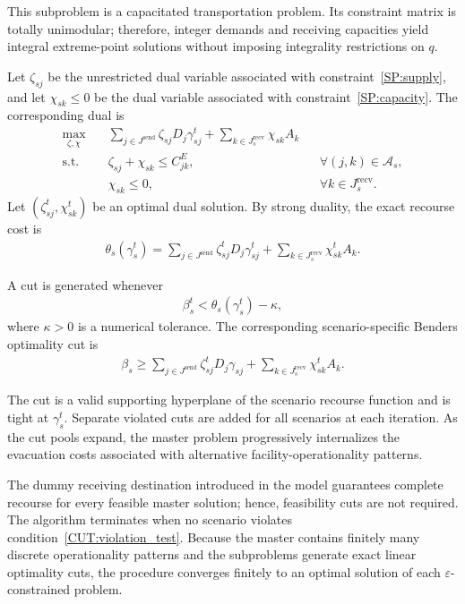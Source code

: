 \documentclass[preprint,11pt,authoryear]{elsarticle}
\begin{document}
This subproblem is a capacitated transportation problem. Its constraint
matrix is totally unimodular; therefore, integer demands and receiving
capacities yield integral extreme-point solutions without imposing
integrality restrictions on $q$.

Let $\zeta_{sj}$ be the unrestricted dual variable associated with
constraint~\eqref{SP:supply}, and let $\chi_{sk}\leq0$ be the dual variable
associated with constraint~\eqref{SP:capacity}. The corresponding dual is
\begin{align}
\max_{\zeta,\chi}\quad
& \sum_{j\in J^{\mathrm{send}}}\zeta_{sj}D_j\gamma_{sj}^t
+\sum_{k\in J_s^{\mathrm{recv}}}\chi_{sk}A_k
\label{DSP:obj}
\\
\text{s.t.}\quad
& \zeta_{sj}+\chi_{sk}\leq C_{jk}^E,
&& \forall (j,k)\in\mathcal A_s,
\label{DSP:arc}
\\
& \chi_{sk}\leq0,
&& \forall k\in J_s^{\mathrm{recv}}.
\label{DSP:sign}
\end{align}
Let
$(\zeta_{sj}^t,\chi_{sk}^t)$ be an optimal dual solution. By strong duality,
the exact recourse cost is
\begin{align}
\theta_s(\gamma_s^t)
=
\sum_{j\in J^{\mathrm{send}}}
\zeta_{sj}^tD_j\gamma_{sj}^t
+
\sum_{k\in J_s^{\mathrm{recv}}}
\chi_{sk}^tA_k.
\label{CUT:recourse_value}
\end{align}

A cut is generated whenever
\begin{align}
\beta_s^t
<
\theta_s(\gamma_s^t)-\kappa,
\label{CUT:violation_test}
\end{align}
where $\kappa>0$ is a numerical tolerance. The corresponding scenario-specific
Benders optimality cut is
\begin{align}
\beta_s
\geq
\sum_{j\in J^{\mathrm{send}}}
\zeta_{sj}^tD_j\gamma_{sj}
+
\sum_{k\in J_s^{\mathrm{recv}}}
\chi_{sk}^tA_k.
\label{CUT:multicut}
\end{align}

The cut is a valid supporting hyperplane of the scenario recourse function
and is tight at $\gamma_s^t$. Separate violated cuts are added for all
scenarios at each iteration. As the cut pools expand, the master problem
progressively internalizes the evacuation costs associated with alternative
facility-operationality patterns.

The dummy receiving destination introduced in the model guarantees complete
recourse for every feasible master solution; hence, feasibility cuts are not
required. The algorithm terminates when no scenario violates
condition~\eqref{CUT:violation_test}. Because the master contains finitely
many discrete operationality patterns and the subproblems generate exact
linear optimality cuts, the procedure converges finitely to an optimal
solution of each $\varepsilon$-constrained problem.
\end{document}
